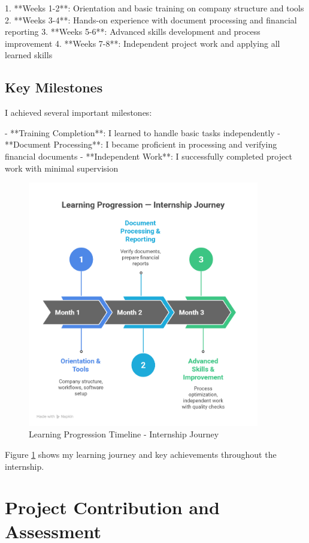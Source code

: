 1. **Weeks 1-2**: Orientation and basic training on company structure and tools
2. **Weeks 3-4**: Hands-on experience with document processing and financial reporting
3. **Weeks 5-6**: Advanced skills development and process improvement
4. **Weeks 7-8**: Independent project work and applying all learned skills

\subsection{Key Milestones}
I achieved several important milestones:

- **Training Completion**: I learned to handle basic tasks independently
- **Document Processing**: I became proficient in processing and verifying financial documents
- **Independent Work**: I successfully completed project work with minimal supervision

\begin{figure}[H]
    \centering
    \includegraphics[width=0.9\textwidth]{assets/images/learning_timeline_chart.png}
    \caption{Learning Progression Timeline - Internship Journey}
    \label{fig:learning_timeline_chart}
\end{figure}

Figure \ref{fig:learning_timeline_chart} shows my learning journey and key achievements throughout the internship.

\section{Project Contribution and Assessment}


